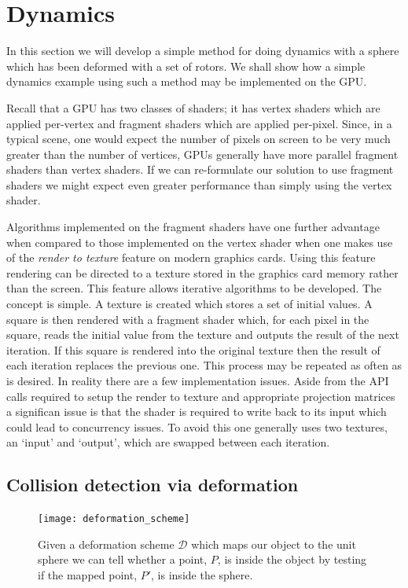 \section{Dynamics}

In this section we will develop a simple method for doing dynamics with a sphere
which has been deformed with a set of rotors. We shall show how a simple dynamics example
using such a method may be implemented on the GPU.

Recall that a GPU has two classes of shaders; it has vertex shaders which are applied
per-vertex and fragment shaders which are applied per-pixel. Since, in a typical scene,
one would expect the number of pixels on screen to be very much greater than the number
of vertices, GPUs generally have more parallel fragment shaders than vertex shaders.
If we can re-formulate our solution to use fragment shaders we might expect even
greater performance than simply using the vertex shader.

Algorithms implemented on the fragment shaders have one further 
advantage when compared to those implemented on the vertex shader when one makes use
of the \emph{render to texture} feature on modern graphics cards. Using this feature
rendering can be directed to a texture stored in the graphics card memory rather than the
screen. This feature allows iterative algorithms to be developed.
The concept is simple. A texture is created which stores a set of initial values. 
A square is then rendered with a fragment shader which, for each pixel in the square,
reads the initial value from the texture and outputs the result of the next iteration.
If this square is rendered into the original texture then the result of each iteration
replaces the previous one. This process may be repeated as often as is desired.
In reality there are a few implementation issues. Aside from the API calls required to
setup the render to texture and appropriate projection matrices a significan issue is
that the shader is required to write back to its input which could lead to
concurrency issues. To avoid this one generally uses two textures, an `input' and `output',
which are swapped between each iteration.

\subsection{Collision detection via deformation}

\begin{figure}
\centering
\texttt{[image: deformation\_scheme]}
\caption{\label{fig:deformation_scheme}Given a deformation scheme $\mathcal{D}$ which maps
  our object to the unit sphere we can tell whether a point, $P$, is inside the object by
          testing if the mapped point, $P'$, is inside the sphere.}
\end{figure}

